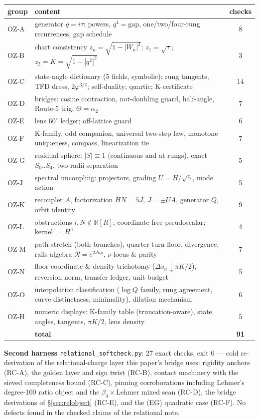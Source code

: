 \documentclass[11pt]{article}
\newcommand{\R}{\mathbb{R}}
\newcommand{\gp}{\varphi}
\newcommand{\gapc}{\mathrm{gap}}
\theoremstyle{plain}
\theoremstyle{definition}
\theoremstyle{remark}
\begin{document}
\begin{center}\footnotesize\setlength{\tabcolsep}{4pt}
\begin{tabular}{@{}lp{11.6cm}c@{}}
\toprule
group & content & checks\\
\midrule
OZ-A & generator $q=i\tau$: powers, $q^4=\gapc$, one/two/four-rung recurrences, gap schedule & 8\\
OZ-B & chart consistency $z_n=\sqrt{1-|W_n|^2}$; $z_1=\sqrt\tau$; $z_2=K=\sqrt{1-|q^2|^2}$ & 3\\
OZ-C & state-angle dictionary (5 fields, symbolic); rung tangents, TFD dress, $2\gp^{3/2}$; self-duality; quartic; K-certificate & 14\\
OZ-D & bridges: cosine contraction, not-doubling guard, half-angle, Route-5 trig, $\Theta=\alpha_2$ & 7\\
OZ-E & lens $60^\circ$ ledger; off-lattice guard & 6\\
OZ-F & K-family, odd companion, universal two-step law, monotone uniqueness, compass, linearization tie & 7\\
OZ-G & residual sphere: $|S|\equiv1$ (continuous and at rungs), exact $S_0..S_4$, two-radii separation & 5\\
OZ-J & spectral uncoupling: projectors, grading $U=H/\sqrt5$, mode action & 5\\
OZ-K & recoupler $A$, factorization $HN=5J$, $J=\pm UA$, generator $Q$, orbit identity & 9\\
OZ-L & obstructions $i,N\notin\R[R]$; coordinate-free pseudoscalar; kernel $=H^\perp$ & 4\\
OZ-M & path stretch (both branches), quarter-turn floor, divergence, rails algebra $\mathcal R=e^{2J\kappa\rho}$, $\nu$-locus \& parity & 7\\
OZ-N & floor coordinate \& density trichotomy ($\Delta s_n\downarrow\pi K/2$), reversion norm, transfer ledger, unit budget & 5\\
OZ-O & interpolation classification ($\log Q$ family, rung agreement, curve distinctness, minimality), dilation mechanism & 6\\
OZ-H & numeric displays: K-family table (truncation-aware), state angles, tangents, $\pi K/2$, lens density & 5\\
\midrule
 & \textbf{total} & \textbf{91}\\
\bottomrule
\end{tabular}
\end{center}

\smallskip\noindent
\smallskip\noindent
\textbf{Second harness} \texttt{relational\_softcheck.py}: 27 exact checks,
exit 0 --- cold re-derivation of the relational-charge layer this paper's
bridge uses: rigidity anchors (RC-A), the golden layer and sign twist (RC-B),
contact machinery with the sieved completeness bound (RC-C), pinning
corroborations including Lehmer's degree-100 ratio object and the
$\beta_4\times$Lehmer mixed scan (RC-D), the bridge derivations of
\S\ref{sec:relobject} (RC-E), and the (EG) quadratic case (RC-F). No defects
found in the checked claims of the relational note.
\end{document}
